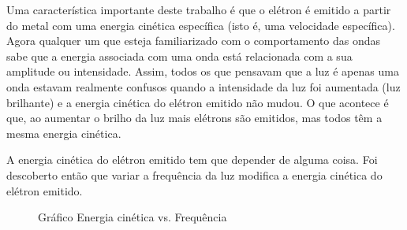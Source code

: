 Uma característica importante deste trabalho é que o elétron é emitido a partir do metal com uma energia cinética específica (isto é, uma velocidade específica). Agora qualquer um que esteja familiarizado com o comportamento das ondas sabe que a energia associada com uma onda está relacionada com a sua amplitude ou intensidade. Assim, todos os que pensavam que a luz é apenas uma onda estavam realmente confusos quando a intensidade da luz foi aumentada (luz brilhante) e a energia cinética do elétron emitido não mudou. O que acontece é que, ao aumentar o brilho da luz mais elétrons são emitidos, mas todos têm a mesma energia cinética.

A energia cinética do elétron emitido tem que depender de alguma coisa. Foi descoberto então que variar a frequência da luz modifica a energia cinética do elétron emitido\cite{greene}.

%

\begin{figure}[H]
\begin{center}
\end{center}
\caption{Gráfico Energia cinética vs. Frequência}
\label{kinect_freq}
\end{figure}

